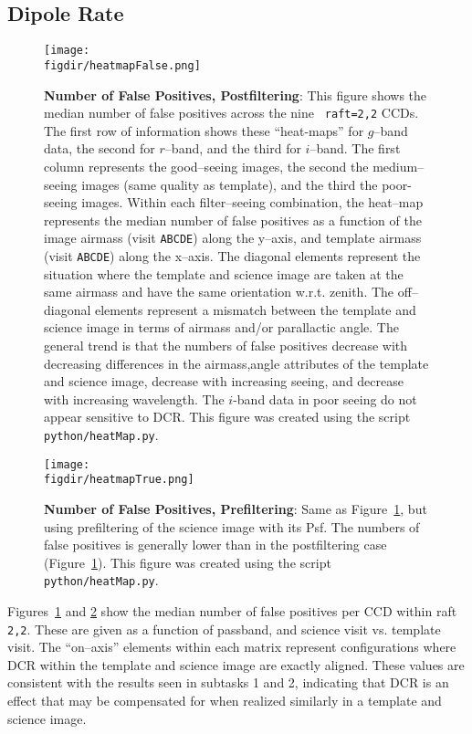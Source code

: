 \documentclass[prd, nofootinbib, floatfix, 11pt, tightenlines, times]{article}
\def\figdir{../figures}
\def\A{{\tt A}}
\def\B{{\tt B}}
\def\C{{\tt C}}
\def\D{{\tt D}}
\def\E{{\tt E}}
\begin{document}
\subsection{Dipole Rate}


\begin{figure}[!ht]
  \centering
  \texttt{[image: \\figdir/heatmapFalse.png]}
  \caption{{\bf Number of False Positives, Postfiltering}: This figure
    shows the median number of false positives across the nine {\tt
      raft=2,2} CCDs.  The first row of information shows these
    ``heat-maps'' for $g$--band data, the second for $r$--band, and
    the third for $i$--band.  The first column represents the
    good--seeing images, the second the medium--seeing images (same
    quality as template), and the third the poor-seeing images.
    Within each filter--seeing combination, the heat--map represents
    the median number of false positives as a function of the image
    airmass (visit \A\B\C\D\E) along the y--axis, and template airmass
    (visit \A\B\C\D\E) along the x--axis.  The diagonal elements
    represent the situation where the template and science image are
    taken at the same airmass and have the same orientation
    w.r.t. zenith.  The off--diagonal elements represent a mismatch
    between the template and science image in terms of airmass and/or
    parallactic angle.  The general trend is that the numbers of false
    positives decrease with decreasing differences in the
    airmass,angle attributes of the template and science image,
    decrease with increasing seeing, and decrease with increasing
    wavelength.  The $i$-band data in poor seeing do not appear
    sensitive to DCR.  This figure was created using the script {\tt
      python/heatMap.py}.}
  \label{fig:heatpost}
\end{figure}

\begin{figure}[!ht]
  \centering
  \texttt{[image: \\figdir/heatmapTrue.png]}
  \caption{{\bf Number of False Positives, Prefiltering}: Same as
    Figure~\ref{fig:heatpost}, but using prefiltering of the science
    image with its Psf.  The numbers of false positives is generally
    lower than in the postfiltering case (Figure~\ref{fig:heatpost}).
    This figure was created using the script {\tt python/heatMap.py}.}
  \label{fig:heatpre}
\end{figure}

Figures~\ref{fig:heatpost} and \ref{fig:heatpre} show the median
number of false positives per CCD within raft {\tt 2,2}.  These are
given as a function of passband, and science visit vs. template visit.
The ``on--axis'' elements within each matrix represent configurations
where DCR within the template and science image are exactly aligned.
These values are consistent with the results seen in subtasks 1 and 2,
indicating that DCR is an effect that may be compensated for when
realized similarly in a template and science image.
\end{document}
